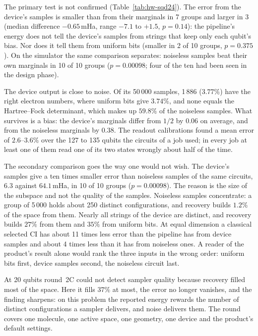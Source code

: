 \documentclass[11pt,a4paper]{article}
\begin{document}
The primary test is not confirmed (Table~\ref{tab:hw-sqd24}). The error from
the device's samples is smaller than from their marginals in 7 groups and
larger in 3 (median difference $-0.65$\,mHa, range $-7.1$ to $+1.5$,
$p = 0.14$): the pipeline's energy does not tell the device's samples from
strings that keep only each qubit's bias. Nor does it tell them from uniform
bits (smaller in 2 of 10 groups, $p = 0.375$). On the simulator the same
comparison separates: noiseless samples beat their own marginals in 10 of 10
groups ($p = 0.00098$; four of the ten had been seen in the design phase).

The device output is close to noise. Of its 50\,000 samples, 1\,886
($3.77\%$) have the right electron numbers, where uniform bits give
$3.74\%$, and none equals the Hartree--Fock determinant, which makes up
$59.8\%$ of the noiseless samples. What survives is a bias: the device's
marginals differ from $1/2$ by $0.06$ on average, and from the noiseless
marginals by $0.38$. The readout calibrations found a mean error of
$2.6$--$3.6\%$ over the 127 to 135 qubits the circuits of a job used; in
every job at least one of them read one of its two states wrongly about
half of the time.

The secondary comparison goes the way one would not wish. The device's
samples give a ten times smaller error than noiseless samples of the same
circuits, $6.3$ against $64.1$\,mHa, in 10 of 10 groups ($p = 0.00098$). The
reason is the size of the subspace and not the quality of the samples.
Noiseless samples concentrate: a group of 5\,000 holds about 250 distinct
configurations, and recovery builds $1.2\%$ of the space from them. Nearly
all strings of the device are distinct, and recovery builds $27\%$ from
them and $35\%$ from uniform bits. At equal dimension a classical selected
CI has about 11 times less error than the pipeline has from device samples
and about 4 times less than it has from noiseless ones. A reader of the
product's result alone would rank the three inputs in the wrong order:
uniform bits first, device samples second, the noiseless circuit last.

At 20 qubits round~2C could not detect sampler quality because recovery
filled most of the space. Here it fills $37\%$ at most, the error no
longer vanishes, and the finding sharpens: on this problem the reported
energy rewards the number of distinct configurations a sampler delivers,
and noise delivers them. The round covers one molecule, one active space,
one geometry, one device and the product's default settings.
\end{document}
